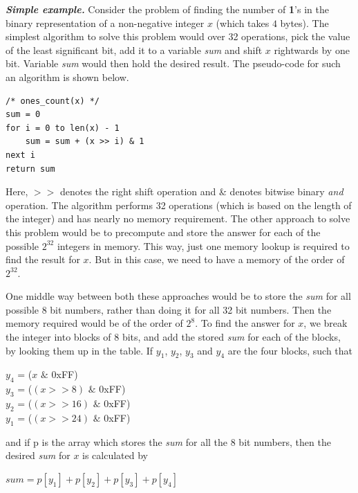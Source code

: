 \noindent \textit{\textbf{Simple example.}} Consider the problem of finding the number of \textbf{1}'s in the binary representation of a non-negative integer $x$ (which takes $4$ bytes). The simplest algorithm to solve this problem would over 32 operations, pick the value of the least significant bit, add it to a variable \textit{sum} and shift $x$ rightwards by one bit. Variable \textit{sum} would then hold the desired result. The pseudo-code for such an algorithm is shown below.

\begin{lstlisting}[frame=tb]
/* ones_count(x) */
sum = 0
for i = 0 to len(x) - 1
    sum = sum + (x >> i) & 1
next i
return sum
\end{lstlisting}

Here, $>>$ denotes the right shift operation and \& denotes bitwise binary \emph{and} operation. The algorithm performs 32 operations (which is based on the length of the integer) and has nearly no memory requirement. The other approach to solve this problem would be to precompute and store the answer for each of the possible $2^{32}$ integers in memory. This way, just one memory lookup is required to find the result for $x$. But in this case, we need to have a memory of the order of $2^{32}$. 

One middle way between both these approaches would be to store the \textit{sum} for all possible 8 bit numbers, rather than doing it for all 32 bit numbers. Then the memory required would be of the order of $2^{8}$. To find the answer for $x$, we break the integer into blocks of 8 bits, and add the stored \textit{sum} for each of the blocks, by looking them up in the table. If $y_1$, $y_2$, $y_3$ and $y_4$ are the four blocks, such that

\begin{center}
$y_4$ = ($x$ $\&$ $0$xFF)\\
$y_3$ = ($(x >> 8)$ $\&$ $0$xFF)\\ 
$y_2$ = ($(x >> 16)$ $\&$ $0$xFF)\\ 
$y_1$ = ($(x >> 24)$ $\&$ $0$xFF)\\
\end{center}

and if p is the array which stores the \textit{sum} for all the 8 bit numbers, then the desired \textit{sum} for $x$ is calculated by

\begin{center}
$sum = p[y_1] + p[y_2] + p[y_3] + p[y_4]$\\
\end{center}

